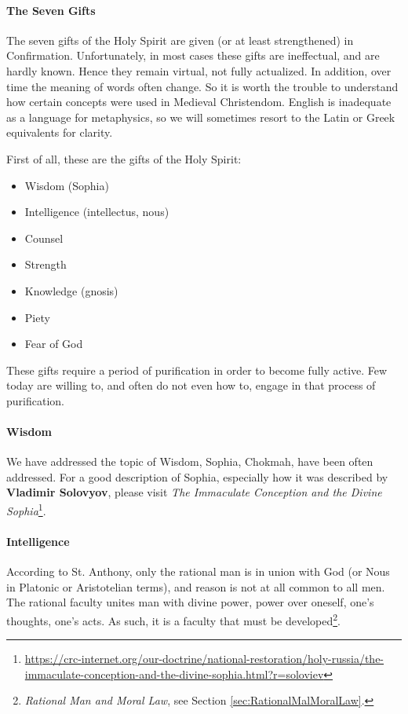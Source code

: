 \paragraph{The Seven Gifts}
The seven gifts of the Holy Spirit are given (or at least strengthened) in Confirmation. Unfortunately, in most cases these gifts are ineffectual, and are hardly known. Hence they remain virtual, not fully actualized. In addition, over time the meaning of words often change. So it is worth the trouble to understand how certain concepts were used in Medieval Christendom. English is inadequate as a language for metaphysics, so we will sometimes resort to the Latin or Greek equivalents for clarity.

First of all, these are the gifts of the Holy Spirit:

\begin{itemize}
\item Wisdom (Sophia) 
\item Intelligence (intellectus, nous) 
\item Counsel 
\item Strength 
\item Knowledge (gnosis) 
\item Piety 
\item Fear of God 
\end{itemize}
These gifts require a period of purification in order to become fully active. Few today are willing to, and often do not even how to, engage in that process of purification.

\paragraph{Wisdom}
We have addressed the topic of Wisdom, Sophia, Chokmah, have been often addressed. For a good description of Sophia, especially how it was described by \textbf{Vladimir Solovyov}, please visit \textit{The Immaculate Conception and the Divine Sophia}\footnote{\url{https://crc-internet.org/our-doctrine/national-restoration/holy-russia/the-immaculate-conception-and-the-divine-sophia.html?r=soloviev}}.

\paragraph{Intelligence}
According to St. Anthony, only the rational man is in union with God (or Nous in Platonic or Aristotelian terms), and reason is not at all common to all men. The rational faculty unites man with divine power, power over oneself, one's thoughts, one's acts. As such, it is a faculty that must be developed\footnote{\textit{Rational Man and Moral Law}, see Section \ref{sec:RationalMalMoralLaw}.}.

